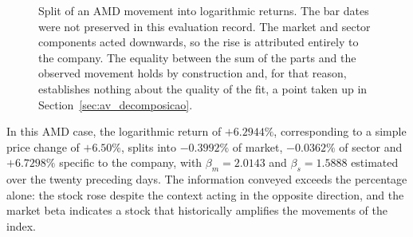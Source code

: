 \begin{figure}[htbp]
\centering
{}
\caption[A movement split into three parts]{Split of an AMD movement into logarithmic returns.
The bar dates were not preserved in this evaluation record. The market and sector components acted downwards, so the rise is attributed
entirely to the company. The equality between the sum of the parts and the observed movement holds
by construction and, for that reason, establishes nothing about the quality of the fit, a point
taken up in Section~\ref{sec:av_decomposicao}.}
\label{fig:met_decomposicao}
\end{figure}

In this AMD case, the logarithmic return of $+6.2944\%$,
corresponding to a simple price change of $+6.50\%$, splits into $-0.3992\%$ of market, $-0.0362\%$
of sector and $+6.7298\%$ specific to the company, with $\beta_m = 2.0143$ and $\beta_s = 1.5888$
estimated over the twenty preceding days. The information conveyed exceeds the percentage alone:
the stock rose despite the context acting in the opposite direction, and the market beta indicates
a stock that historically amplifies the movements of the index.

